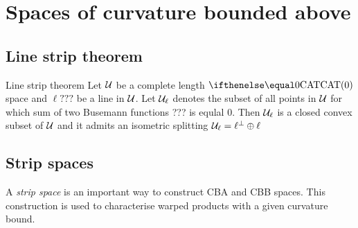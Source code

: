 \chapter{Spaces of curvature bounded above}

\section{Line strip theorem}

\begin{thm}{Line strip theorem}\label{split=<0}
Let $\mathcal{U}$ be a complete length $\CAT0$ space and $\ell???$ be a line in $\mathcal{U}$.
 Let $\mathcal{U}_\ell$ denotes the subset of all points in $\mathcal{U}$ for which sum of two Busemann functions ??? is equlal $0$.
Then $\mathcal{U}_\ell$ is a closed convex subset of $\mathcal{U}$ and it admits an isometric splitting $\mathcal{U}_\ell=\ell^\perp\oplus\ell$
\end{thm}




\section{Strip spaces}

A \emph{strip space} is an important way to construct  CBA and CBB spaces. This construction is used to characterise warped products with a given curvature bound.

